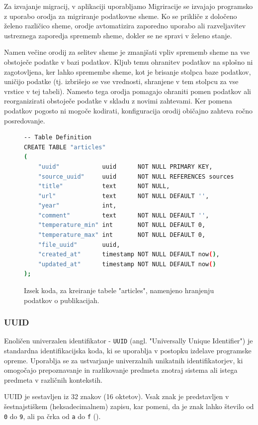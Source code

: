 \documentclass[a4paper, 12pt]{book}
\begin{document}
Za izvajanje migracij, v aplikaciji uporabljamo 
Migriracije se izvajajo programsko z uporabo orodja za migriranje podatkovne sheme. Ko se prikliče z določeno želeno različico sheme, orodje avtomatizira zaporedno uporabo ali razveljavitev ustreznega zaporedja sprememb sheme, dokler se ne spravi v želeno stanje.

Namen večine orodij za selitev sheme je zmanjšati vpliv sprememb sheme na vse obstoječe podatke v bazi podatkov. Kljub temu ohranitev podatkov na splošno ni zagotovljena, ker lahko spremembe sheme, kot je brisanje stolpca baze podatkov, uničijo podatke (tj. izbrišejo se vse vrednosti, shranjene v tem stolpcu za vse vrstice v tej tabeli). Namesto tega orodja pomagajo ohraniti pomen podatkov ali reorganizirati obstoječe podatke v skladu z novimi zahtevami. Ker pomena podatkov pogosto ni mogoče kodirati, konfiguracija orodij običajno zahteva ročno posredovanje.

\begin{figure}
\centering
\begin{lstlisting}[language=bash, style=mystyle]
-- Table Definition
CREATE TABLE "articles"
(
    "uuid"            uuid      NOT NULL PRIMARY KEY,
    "source_uuid"     uuid      NOT NULL REFERENCES sources (uuid) ON DELETE CASCADE,
    "title"           text      NOT NULL,
    "url"             text      NOT NULL DEFAULT '',
    "year"            int,
    "comment"         text      NOT NULL DEFAULT '',
    "temperature_min" int       NOT NULL DEFAULT 0,
    "temperature_max" int       NOT NULL DEFAULT 0,
    "file_uuid"       uuid,
    "created_at"      timestamp NOT NULL DEFAULT now(),
    "updated_at"      timestamp NOT NULL DEFAULT now()
);
\end{lstlisting}
\caption{Izsek koda, za kreiranje tabele "articles", namenjeno hranjenju podatkov o publikacijah.}
\end{figure}

\subsubsection{UUID}
Enoličen univerzalen identifikator - \verb=UUID= (angl. "Universally Unique Identifier") je standardna identifikacijska koda, ki se uporablja v postopku izdelave programske opreme. Uporablja se za ustvarjanje univerzalnih unikatnih identifikatorjev, ki omogočajo prepoznavanje in razlikovanje predmeta znotraj sistema ali istega predmeta v različnih kontekstih.

UUID je sestavljen iz 32 znakov (16 oktetov). Vsak znak je predstavljen v šestnajstiškem (heksadecimalnem) zapisu, kar pomeni, da je znak lahko število od \verb=0= do \verb=9=, ali pa črka od \verb=a= do \verb=f= (\cite{uuid-rfc}).
\end{document}
